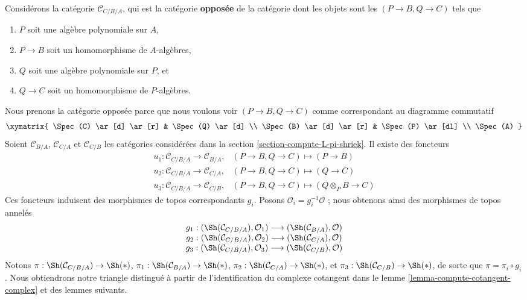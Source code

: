 \medskip\noindent
Considérons la catégorie $\mathcal{C}_{C/B/A}$, qui est la catégorie
{\bf opposée} de la catégorie dont les objets sont les
$(P \to B, Q \to C)$ tels que
\begin{enumerate}
\item $P$ soit une algèbre polynomiale sur $A$,
\item $P \to B$ soit un homomorphisme de $A$-algèbres,
\item $Q$ soit une algèbre polynomiale sur $P$, et
\item $Q \to C$ soit un homomorphisme de $P$-algèbres.
\end{enumerate}
Nous prenons la catégorie opposée parce que nous voulons voir
$(P \to B, Q \to C)$ comme correspondant au diagramme commutatif
$$
\xymatrix{
\Spec(C) \ar[d] \ar[r] & \Spec(Q) \ar[d] \\
\Spec(B) \ar[d] \ar[r] & \Spec(P) \ar[dl] \\
\Spec(A)
}
$$
Soient $\mathcal{C}_{B/A}$, $\mathcal{C}_{C/A}$ et $\mathcal{C}_{C/B}$
les catégories considérées dans la section
\ref{section-compute-L-pi-shriek}. Il existe des foncteurs
$$
\begin{matrix}
u_1 : \mathcal{C}_{C/B/A} \to \mathcal{C}_{B/A}, &
(P \to B, Q \to C) \mapsto (P \to B) \\
u_2 : \mathcal{C}_{C/B/A} \to \mathcal{C}_{C/A}, &
(P \to B, Q \to C) \mapsto (Q \to C) \\
u_3 : \mathcal{C}_{C/B/A} \to \mathcal{C}_{C/B}, &
(P \to B, Q \to C) \mapsto (Q \otimes_P B \to C)
\end{matrix}
$$
Ces foncteurs induisent des morphismes de topos correspondants $g_i$.
Posons $\mathcal{O}_i = g_i^{-1}\mathcal{O}$ ; nous obtenons ainsi des
morphismes de topos annelés
\begin{equation}
\label{equation-three-maps}
\begin{matrix}
g_1 : (\Sh(\mathcal{C}_{C/B/A}), \mathcal{O}_1)
\longrightarrow (\Sh(\mathcal{C}_{B/A}), \mathcal{O}) \\
g_2 : (\Sh(\mathcal{C}_{C/B/A}), \mathcal{O}_2)
\longrightarrow (\Sh(\mathcal{C}_{C/A}), \mathcal{O}) \\
g_3 : (\Sh(\mathcal{C}_{C/B/A}), \mathcal{O}_3)
\longrightarrow (\Sh(\mathcal{C}_{C/B}), \mathcal{O})
\end{matrix}
\end{equation}
Notons
$\pi : \Sh(\mathcal{C}_{C/B/A}) \to \Sh(*)$,
$\pi_1 : \Sh(\mathcal{C}_{B/A}) \to \Sh(*)$,
$\pi_2 : \Sh(\mathcal{C}_{C/A}) \to \Sh(*)$, et
$\pi_3 : \Sh(\mathcal{C}_{C/B}) \to \Sh(*)$,
de sorte que $\pi = \pi_i \circ g_i$. Nous obtiendrons notre triangle
distingué à partir de l'identification du complexe cotangent dans le lemme
\ref{lemma-compute-cotangent-complex} et des lemmes suivants.


